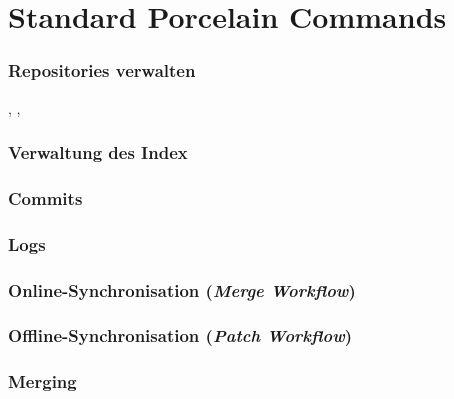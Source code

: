 \documentclass{cms-kurs}
\begin{document}
\section{Standard Porcelain Commands}

\begin{frame}
  \frametitle{Repositories verwalten}

  \onslide<+->

  , , 

\end{frame}

\begin{frame}
  \frametitle{Verwaltung des Index}

  \onslide<+->


\end{frame}

\begin{frame}
  \frametitle{Commits}

  \onslide<+->


\end{frame}

\begin{frame}
  \frametitle{Logs}

  \onslide<+->


\end{frame}

\begin{frame}
  \frametitle{Online-Synchronisation (\emph{Merge Workflow})}

  \onslide<+->


\end{frame}

\begin{frame}
  \frametitle{Offline-Synchronisation (\emph{Patch Workflow})}

  \onslide<+->


\end{frame}

\begin{frame}
  \frametitle{Merging}

  \onslide<+->


\end{frame}
\end{document}
